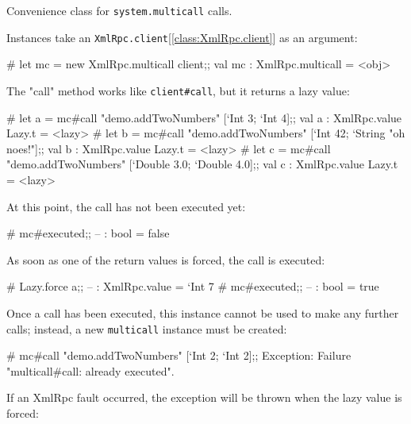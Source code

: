 \documentclass[11pt]{article}
\begin{document}
\begin{ocamldocdescription}
Convenience class for {\tt{system.multicall}} calls.


    Instances take an {\tt{XmlRpc.client}}[\ref{class:XmlRpc.client}] as an argument: \begin{ocamldoccode}

        # let mc = new XmlRpc.multicall client;;
        val mc : XmlRpc.multicall = <obj>
    
\end{ocamldoccode}

    The "call" method works like {\tt{client\verb`#`call}}, but it returns a lazy
    value: \begin{ocamldoccode}

        # let a = mc#call "demo.addTwoNumbers" [`Int 3; `Int 4];;
        val a : XmlRpc.value Lazy.t = <lazy>
        # let b = mc#call "demo.addTwoNumbers" [`Int 42; `String "oh noes!"];;
        val b : XmlRpc.value Lazy.t = <lazy>
        # let c = mc#call "demo.addTwoNumbers" [`Double 3.0; `Double 4.0];;
        val c : XmlRpc.value Lazy.t = <lazy>
    
\end{ocamldoccode}

    At this point, the call has not been executed yet: \begin{ocamldoccode}

        # mc#executed;;
        -- : bool = false
    
\end{ocamldoccode}

    As soon as one of the return values is forced, the call is executed: \begin{ocamldoccode}

        # Lazy.force a;;
        -- : XmlRpc.value = `Int 7
        # mc#executed;;
        -- : bool = true
    
\end{ocamldoccode}

    Once a call has been executed, this instance cannot be used to make any
    further calls; instead, a new {\tt{multicall}} instance must be created: \begin{ocamldoccode}

        # mc#call "demo.addTwoNumbers" [`Int 2; `Int 2];;
        Exception: Failure "multicall#call: already executed".
    
\end{ocamldoccode}

    If an XmlRpc fault occurred, the exception will be thrown when the lazy
    value is forced: \begin{ocamldoccode}


\end{ocamldoccode}
\end{ocamldocdescription}
\end{document}
